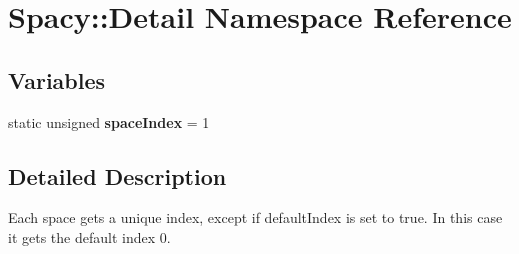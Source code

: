 \hypertarget{namespaceSpacy_1_1Detail}{\section{\-Spacy\-:\-:\-Detail \-Namespace \-Reference}
\label{namespaceSpacy_1_1Detail}
}
\subsection*{\-Variables}
\begin{DoxyCompactItemize}
\item 
\hypertarget{namespaceSpacy_1_1Detail_ae4efe718b35e0e82c967eaa8833b6744}{static unsigned {\bfseries space\-Index} = 1}\label{namespaceSpacy_1_1Detail_ae4efe718b35e0e82c967eaa8833b6744}

\end{DoxyCompactItemize}


\subsection{\-Detailed \-Description}
\-Each space gets a unique index, except if default\-Index is set to true. \-In this case it gets the default index 0. 